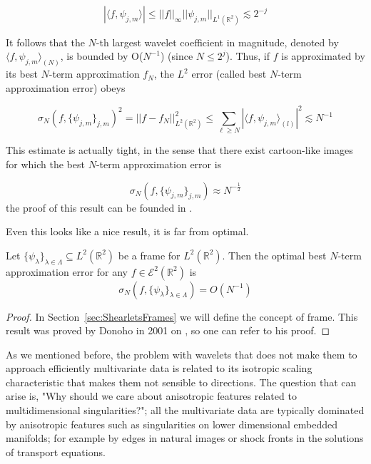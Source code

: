 $$
|\langle f,	\psi_{j,m}\rangle|\leq ||f||_{\infty}||\psi_{j,m}||_{L^1(\mathbb{R}^2)}\lesssim 2^{-j}
$$

It follows that the $N$-th largest wavelet coefficient in magnitude, denoted by $\langle f,\psi_{j,m}\rangle_{(N)}$, is bounded by O($N^{-1}$) (since $N\leq 2^j$). Thus, if $f$ is approximated by its best $N$-term approximation $f_N$, the $L^2$ error (called  best $N$-term approximation error) obeys

$$
\sigma_N(f,\{\psi_{j,m}\}_{j,m})^2=||f-f_N||^2_{L^2(\mathbb{R}^2)}\leq \sum_{\ell\geq N}|\langle f,\psi_{j,m}\rangle_{(l)}|^2\lesssim N^{-1}
$$

This estimate is actually tight, in the sense that there exist cartoon-like images for which the best $N$-term approximation error is

$$
\sigma_N(f,\{\psi_{j,m}\}_{j,m})\approx N^{-\frac{1}{2}}
$$
the proof of this result can be founded in \cite{Mallat}.

Even this looks like a nice result, it is far from optimal.

\bigskip

\begin{thm}
\label{C3S2T1}
Let $\{\psi_{\lambda}\}_{\lambda\in\Lambda}\subseteq L^2(\mathbb{R}^2)$ be a frame for $L^2(\mathbb{R}^2)$. Then the optimal best $N$-term approximation error for any $f\in\mathcal{E}^2(\mathbb{R}^2)$ is
$$
\sigma_N(f,\{\psi_{\lambda}\}_{\lambda\in\Lambda})=O(N^{-1})
$$
\end{thm}
\begin{proof}
In Section~\ref{sec:ShearletsFrames} we will define the concept of frame. This result was proved by Donoho in 2001 on \cite{DonohobestNterm}, so one can refer to his proof.
\end{proof}

\bigskip

As we mentioned before, the problem with wavelets that does not make them to approach efficiently multivariate data is related to its isotropic scaling characteristic that makes them not sensible to directions. The question that can arise is, "Why should we care about anisotropic features related to multidimensional singularities?"; all the multivariate data are typically dominated by anisotropic features such as singularities on lower dimensional embedded manifolds; for example by edges in natural images or shock fronts in the solutions of transport equations. 

